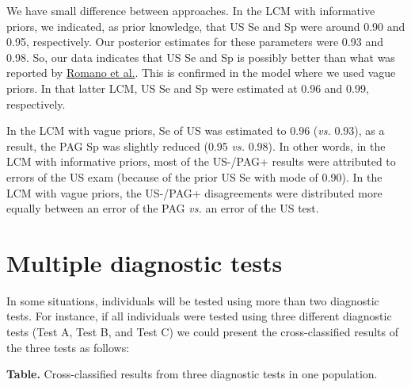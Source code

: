\documentclass[
]{book}
\begin{document}
We have small difference between approaches. In the LCM with informative priors, we indicated, as prior knowledge, that US Se and Sp were around 0.90 and 0.95, respectively. Our posterior estimates for these parameters were 0.93 and 0.98. So, our data indicates that US Se and Sp is possibly better than what was reported by \href{https://www.sciencedirect.com/science/article/pii/S0093691X06001543?via\%3Dihub}{Romano et al.}. This is confirmed in the model where we used vague priors. In that latter LCM, US Se and Sp were estimated at 0.96 and 0.99, respectively.

In the LCM with vague priors, Se of US was estimated to 0.96 (\emph{vs.} 0.93), as a result, the PAG Sp was slightly reduced (0.95 \emph{vs.} 0.98). In other words, in the LCM with informative priors, most of the US-/PAG+ results were attributed to errors of the US exam (because of the prior US Se with mode of 0.90). In the LCM with vague priors, the US-/PAG+ disagreements were distributed more equally between an error of the PAG \emph{vs.} an error of the US test.

\chapter{Multiple diagnostic tests}\label{multiple-diagnostic-tests}

In some situations, individuals will be tested using more than two diagnostic tests. For instance, if all individuals were tested using three different diagnostic tests (Test A, Test B, and Test C) we could present the cross-classified results of the three tests as follows:

\textbf{Table.} Cross-classified results from three diagnostic tests in one population.
\end{document}
